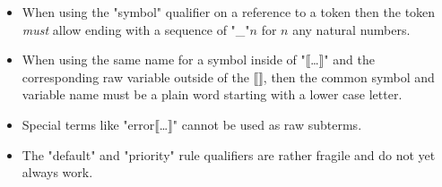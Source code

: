 \documentclass[11pt]{article} %
\begin{document}
\begin{itemize}
\item When using the "symbol" qualifier on a reference to a token then the token \emph{must} allow
  ending with a sequence of "_"$n$ for $n$ any natural numbers.

\item When using the same name for a symbol inside of "⟦…⟧" and the corresponding raw variable
  outside of the ⟦⟧, then the common symbol and variable name must be a plain word starting with a
  lower case letter.

\item Special terms like "error⟦…⟧" cannot be used as raw subterms.

\item The "default" and "priority" rule qualifiers are rather fragile and do not yet always work.

\end{itemize}



\end{document}
